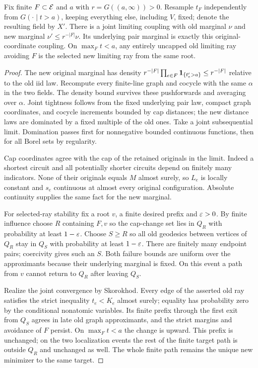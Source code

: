 \begin{lemma}\label{lem:lift}
Fix finite $F\subset\mathcal E$ and $a$ with $r=G((a,\infty))>0$.
Resample $t_F$ independently from $G(\cdot\mid t>a)$, keeping everything
else, including $V$, fixed; denote the resulting field by $X'$. There is
a joint limiting coupling with old marginal $\nu$ and new marginal
$\nu'\le r^{-|F|}\nu$. Its underlying pair marginal is exactly this
original-coordinate coupling. On $\max_Ft<a$, any entirely uncapped old
limiting ray avoiding $F$ is the selected new limiting ray from the same root.
\end{lemma}
\begin{proof}
The new original marginal has density
$r^{-|F|}\prod_{e\in F}\mathbf1_{\{t'_e>a\}}\le r^{-|F|}$ relative to the
old iid law. Recompute every finite-line graph and cocycle with the same
$\alpha$ in the two fields. The density bound survives these pushforwards
and averaging over $\alpha$. Joint tightness follows from the fixed
underlying pair law, compact graph coordinates, and cocycle increments
bounded by cap distances; the new distance laws are dominated by a fixed
multiple of the old ones. Take a joint subsequential limit. Domination
passes first for nonnegative bounded continuous functions, then for all
Borel sets by regularity.

Cap coordinates agree with the cap of the retained originals in the limit.
Indeed a shortest circuit and all potentially shorter circuits depend on
finitely many indicators. None of their originals equals $M$ almost surely,
so $L_e$ is locally constant and $s_e$ continuous at almost every original
configuration. Absolute continuity supplies the same fact for the new marginal.

For selected-ray stability fix a root $v$, a finite desired prefix and
$\varepsilon>0$. By finite influence choose $R$ containing $F,v$ so the cap-change
set lies in $Q_R$ with probability at least $1-\varepsilon$. Choose $S\ge R$ so
all old geodesics between vertices of $Q_R$ stay in $Q_S$ with probability
at least $1-\varepsilon$. There are finitely many endpoint pairs; coercivity gives
such an $S$. Both failure bounds are uniform over the approximants because
their underlying marginal is fixed. On this event a path from $v$ cannot
return to $Q_R$ after leaving $Q_S$.

Realize the joint convergence by Skorokhod. Every edge of the asserted old
ray satisfies the strict inequality $t_e<K_e$ almost surely; equality has
probability zero by the conditional nonatomic variables. Its finite prefix
through the first exit from $Q_S$ agrees in late old graph approximants,
and the strict margins and avoidance of $F$ persist. On $\max_Ft<a$ the
change is upward. This prefix is unchanged; on the two localization events
the rest of the finite target path is outside $Q_R$ and unchanged as well.
The whole finite path remains the unique new minimizer to the same target.


\end{proof}
